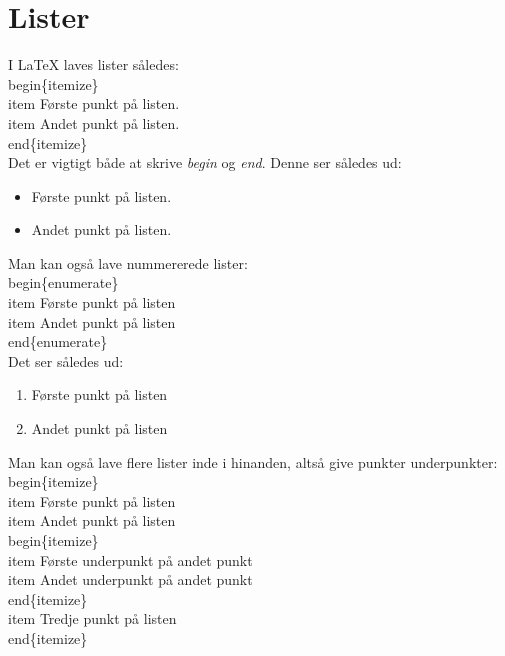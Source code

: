 \section{Lister}
I LaTeX laves lister således:\\

\indent \bs begin\{itemize\}\\
\indent \bs item Første punkt på listen.\\
\indent \bs item Andet punkt på listen.\\
\indent \bs end\{itemize\}\\

\noindent
Det er vigtigt både at skrive \emph{begin} og \emph{end}. Denne ser således ud:

\begin{itemize}
\item Første punkt på listen.
\item Andet punkt på listen.
\end{itemize}

\noindent
Man kan også lave nummererede lister:\\

\indent \bs begin\{enumerate\}\\
\indent \bs item Første punkt på listen\\
\indent \bs item Andet punkt på listen\\
\indent \bs end\{enumerate\}\\

\noindent
Det ser således ud:

\begin{enumerate}
\item Første punkt på listen
\item Andet punkt på listen
\end{enumerate}

\noindent
Man kan også lave flere lister inde i hinanden, altså give punkter underpunkter:\\

\indent \bs begin\{itemize\}\\
\indent \bs item Første punkt på listen\\
\indent \bs item Andet punkt på listen\\
\indent \bs begin\{itemize\}\\
\indent \bs item Første underpunkt på andet punkt\\
\indent \bs item Andet underpunkt på andet punkt\\
\indent \bs end\{itemize\}\\
\indent \bs item Tredje punkt på listen\\
\indent \bs end\{itemize\}\\

